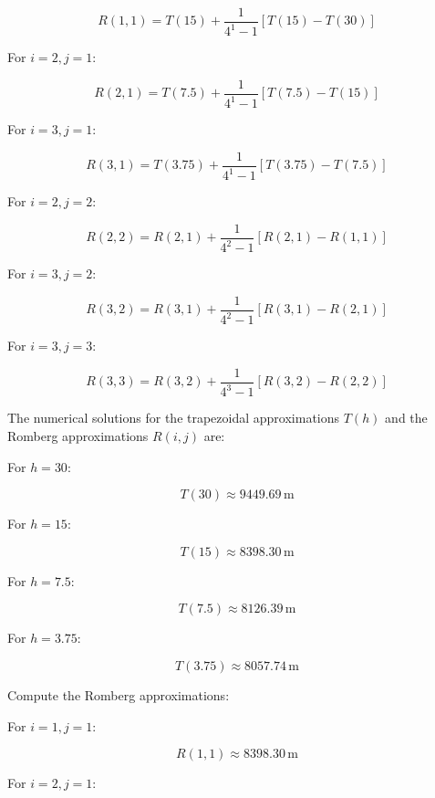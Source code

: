 \documentclass[12pt, a4paper]{article}
\numberwithin{equation}{section}
\begin{document}
\begin{equation}
R(1, 1) = T(15) + \frac{1}{4^{1}-1} \left[T(15) - T(30)\right]
\end{equation}

For \(i = 2, j = 1\):

\begin{equation}
R(2, 1) = T(7.5) + \frac{1}{4^{1}-1} \left[T(7.5) - T(15)\right]
\end{equation}

For \(i = 3, j = 1\):

\begin{equation}
R(3, 1) = T(3.75) + \frac{1}{4^{1}-1} \left[T(3.75) - T(7.5)\right]
\end{equation}

For \(i = 2, j = 2\):

\begin{equation}
R(2, 2) = R(2, 1) + \frac{1}{4^{2}-1} \left[R(2, 1) - R(1, 1)\right]
\end{equation}

For \(i = 3, j = 2\):

\begin{equation}
R(3, 2) = R(3, 1) + \frac{1}{4^{2}-1} \left[R(3, 1) - R(2, 1)\right]
\end{equation}

For \(i = 3, j = 3\):

\begin{equation}
R(3, 3) = R(3, 2) + \frac{1}{4^{3}-1} \left[R(3, 2) - R(2, 2)\right]
\end{equation}

The numerical solutions for the trapezoidal approximations \(T(h)\) and the Romberg approximations \(R(i, j)\) are:

For \(h = 30\):

  $$T(30) \approx 9449.69 \, \text{m}$$

For \(h = 15\):

  $$T(15) \approx 8398.30 \, \text{m}$$

For \(h = 7.5\):

  $$T(7.5) \approx 8126.39 \, \text{m}$$

For \(h = 3.75\):

  $$T(3.75) \approx 8057.74 \, \text{m}$$

Compute the Romberg approximations:

For \(i = 1, j = 1\):

  $$R(1, 1) \approx 8398.30 \, \text{m}$$

For \(i = 2, j = 1\):
\end{document}
